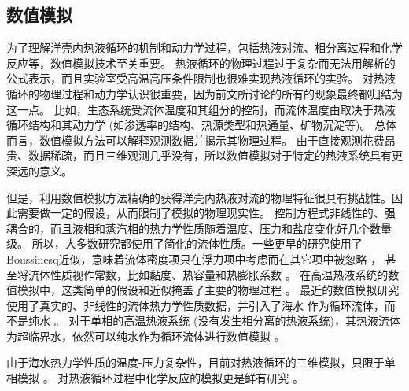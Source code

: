 \subsection{数值模拟} 
为了理解洋壳内热液循环的机制和动力学过程，包括热液对流、相分离过程和化学反应等，数值模拟技术至关重要。
热液循环的物理过程过于复杂而无法用解析的公式表示，而且实验室受高温高压条件限制也很难实现热液循环的实验。
对热液循环的物理过程和动力学认识很重要，因为前文所讨论的所有的现象最终都归结为这一点。
比如，生态系统受流体温度和其组分的控制，而流体温度由取决于热液循环结构和其动力学 (如渗透率的结构、热源类型和热通量、矿物沉淀等)。
总体而言，数值模拟方法可以解释观测数据并揭示其物理过程。
由于直接观测花费昂贵、数据稀疏，而且三维观测几乎没有，所以数值模拟对于特定的热液系统具有更深远的意义。

但是，利用数值模拟方法精确的获得洋壳内热液对流的物理特征很具有挑战性。因此需要做一定的假设，从而限制了模拟的物理现实性。
控制方程式非线性的、强耦合的，而且液相和蒸汽相的热力学性质随着温度、压力和盐度变化好几个数量级。
所以，大多数研究都使用了简化的流体性质。一些更早的研究使用了Boussinesq近似，意味着流体密度项只在浮力项中考虑而在其它项中被忽略 \citep{wilcock1998cellular,schoofs2000depletion} ，
甚至将流体性质视作常数，比如黏度、热容量和热膨胀系数 \citep{cherkaoui1999characteristics} 。
在高温热液系统的数值模拟中，这类简单的假设和近似掩盖了主要的物理过程 \citep{jupp2000thermodynamic,jupp2004physical} 。
最近的数值模拟研究使用了真实的、非线性的流体热力学性质数据，并引入了海水 \citep{lewis2009numerical1,coumou2009phase,vehling2018implementation} 作为循环流体，而不是纯水 \cite{jupp2000thermodynamic} 。
对于单相的高温热液系统 (没有发生相分离的热液系统)，其热液流体为超临界水，依然可以纯水作为循环流体进行数值模拟 \citep{hasenclever2014hybrid} 。

由于海水热力学性质的温度-压力复杂性，目前对热液循环的三维模拟，只限于单相模拟 \cite{hasenclever2014hybrid,coumou2008structure} 。
对热液循环过程中化学反应的模拟更是鲜有研究 \citep{yapparova2017reactive,scott2018permeability} 。

